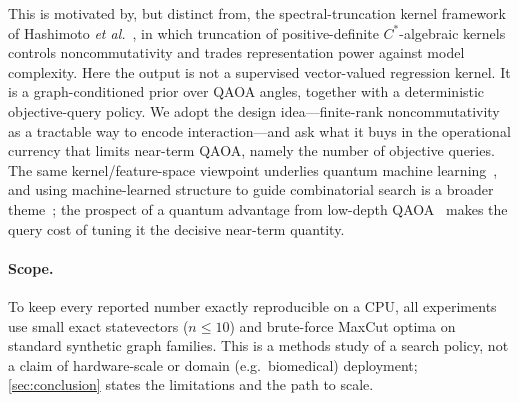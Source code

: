 \documentclass[aps,prxquantum,reprint,amsmath,amssymb,floatfix,nofootinbib,superscriptaddress,longbibliography]{revtex4-2}
\theoremstyle{remark}
\newcommand{\QAOA}{\textnormal{\textsc{QAOA}}}
\begin{document}
This is motivated by, but distinct from, the spectral-truncation kernel
framework of Hashimoto \emph{et al.}~\cite{hashimoto2024spectral}, in which
truncation of positive-definite \(C^*\)-algebraic kernels controls
noncommutativity and trades representation power against model complexity.  Here
the output is not a supervised vector-valued regression kernel.  It is a
graph-conditioned prior over \QAOA{} angles, together with a deterministic
objective-query policy.  We adopt the design idea---finite-rank noncommutativity
as a tractable way to encode interaction---and ask what it buys in the operational
currency that limits near-term QAOA, namely the number of objective queries.
The same kernel/feature-space viewpoint underlies quantum machine
learning~\cite{schuld2019feature}, and using machine-learned
structure to guide combinatorial search is a broader
theme~\cite{bengio2021}; the prospect of a quantum advantage from low-depth
QAOA~\cite{farhi2016supremacy} makes the query cost of tuning it the decisive
near-term quantity.

\paragraph{Scope.}  To keep every reported number exactly reproducible on a CPU,
all experiments use small exact statevectors (\(n\le10\)) and brute-force MaxCut
optima on standard synthetic graph families.  This is a methods study of a search
policy, not a claim of hardware-scale or domain (e.g.\ biomedical) deployment;
\cref{sec:conclusion} states the limitations and the path to scale.
\end{document}
